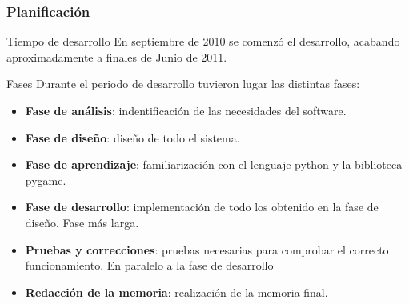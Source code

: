 

\begin{frame}
    \frametitle{Planificación}

        \begin{block}{Tiempo de desarrollo}
            En septiembre de 2010 se comenzó el desarrollo, acabando aproximadamente a finales de Junio de 2011.
        \end{block}
    
        \begin{block}{Fases}
        Durante el periodo de desarrollo tuvieron lugar las distintas fases:
            \begin{itemize}
                \item \textbf{Fase de análisis}: indentificación de las necesidades del software.
                \item \textbf{Fase de diseño}: diseño de todo el sistema.
                \item \textbf{Fase de aprendizaje}: familiarización con el lenguaje python y la biblioteca pygame.
                \item \textbf{Fase de desarrollo}: implementación de todo los obtenido en la fase de diseño. Fase más larga.
                \item \textbf{Pruebas y correcciones}: pruebas necesarias para comprobar el correcto funcionamiento. En paralelo a
                la fase de desarrollo
                \item \textbf{Redacción de la memoria}: realización de la memoria final. 
            \end{itemize}
        \end{block}

\end{frame}

